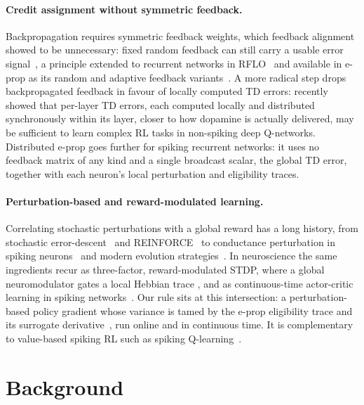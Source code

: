\documentclass[10pt,twocolumn]{article}
\begin{document}
\paragraph{Credit assignment without symmetric feedback.}
Backpropagation requires symmetric feedback weights, which feedback alignment
showed to be unnecessary: fixed random feedback can still carry a usable error
signal~\citep{Lillicrap2016}, a principle extended to recurrent networks in
RFLO~\citep{murray2019local} and available in e-prop as its random and adaptive
feedback variants~\citep{eprop2020}. A more radical step drops backpropagated
feedback in favour of locally computed TD errors: \citet{guan2024artificialdopamine}
recently showed that per-layer TD errors, each computed locally and
distributed synchronously within its layer, closer to how dopamine is actually
delivered, may be sufficient to learn complex RL tasks in non-spiking deep
Q-networks. Distributed e-prop goes further for spiking recurrent networks: it
uses no feedback matrix of any kind and a single broadcast scalar, the global
TD error, together with each neuron's local perturbation and eligibility
traces.

\paragraph{Perturbation-based and reward-modulated learning.}
Correlating stochastic perturbations with a global reward has a long history,
from stochastic error-descent~\citep{Cauwenberghs1992} and
REINFORCE~\citep{Williams1992REINFORCE} to conductance perturbation in spiking
neurons~\citep{fiete2006gradient} and modern evolution
strategies~\citep{salimans2017evolutionstrategiesscalablealternative}. In
neuroscience the same ingredients recur as three-factor, reward-modulated STDP,
where a global neuromodulator gates a local Hebbian trace
\citep{Fremaux2016NeuromodulatedSTDP,Izhikevich2007DistalReward,Florian2007RewardSTDP,Legenstein2008RewardSTDP},
and as continuous-time actor-critic learning in spiking
networks~\citep{Frmaux2013ReinforcementLU}. Our rule sits at this intersection:
a perturbation-based policy gradient whose variance is tamed by the e-prop
eligibility trace and its surrogate derivative~\citep{Neftci2019Surrogate}, run
online and in continuous time. It is complementary to value-based spiking RL
such as spiking Q-learning~\citep{Chen2022SpikingQLearning}.

\section{Background}
\label{sec:background}
\end{document}

